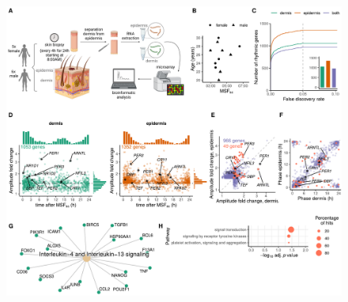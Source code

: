 \begin{figure}[ht]
	\begin{center}
		\includegraphics[scale=0.55]{./Figures/fig1_complete.pdf}

\end{center}
\end{figure}
